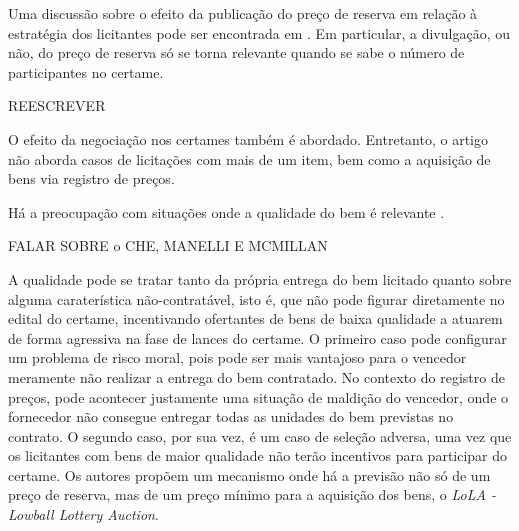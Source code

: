 Uma discussão sobre o efeito da publicação do preço de reserva em relação à estratégia dos licitantes pode ser encontrada em \citet{Bugarin2022}. Em particular, a divulgação, ou não, do preço de reserva só se torna relevante quando se sabe o número de participantes no certame.

{\huge REESCREVER}

O efeito da negociação nos certames também é abordado. Entretanto, o artigo não aborda casos de licitações com mais de um item, bem como a aquisição de bens via registro de preços.

Há a preocupação com situações onde a qualidade do bem é relevante \citet{villa:2022}.

{\huge FALAR SOBRE o CHE, MANELLI E MCMILLAN}

A qualidade pode se tratar tanto da própria entrega do bem licitado quanto sobre alguma caraterística não-contratável, isto é, que não pode figurar diretamente no edital do certame, incentivando ofertantes de bens de baixa qualidade a atuarem de forma agressiva na fase de lances do certame. O primeiro caso pode configurar um problema de risco moral, pois pode ser mais vantajoso para o vencedor meramente não realizar a entrega do bem contratado. No contexto do registro de preços, pode acontecer justamente uma situação de maldição do vencedor, onde o fornecedor não consegue entregar todas as unidades do bem previstas no contrato. O segundo caso, por sua vez, é um caso de seleção adversa, uma vez que os licitantes com bens de maior qualidade não terão incentivos para participar do certame. Os autores propõem um mecanismo onde há a previsão não só de um preço de reserva, mas de um preço mínimo para a aquisição dos bens, o \emph{LoLA - Lowball Lottery Auction}.
